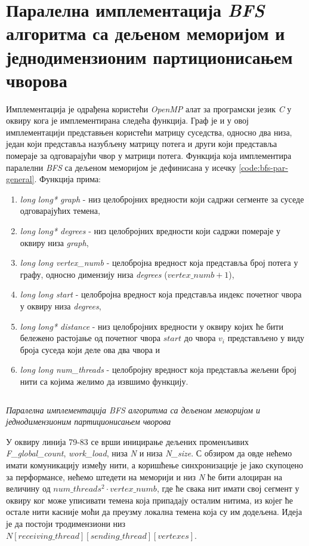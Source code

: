 \section{Паралелна имплементација \textit{BFS} алгоритма са дељеном меморијом и једнодимензионим партиционисањем чворова}
Имплементација је одрађена користећи \textit{OpenMP} алат за програмски језик \textit{C} у оквиру кога је имплементирана следећа функција. Граф је и у овој имплементацији представњен користећи матрицу суседства, односно два низа, један који представља назубљену матрицу потега и други који представља помераје за одговарајући чвор у матрици потега. Функција која имплементира паралелни \textit{BFS} са дељеном меморијом је дефинисана у исечку \ref{code:bfs-par-general}. Функција  прима:
\begin{enumerate}
    \item \textit{long long* graph} - низ целобројних вредности који садржи сегменте за суседе одговарајућих темена,
    \item \textit{long long* degrees} - низ целобројних вредности који садржи помераје у оквиру низа \textit{graph},
    \item \textit{long long vertex\_numb} - целобројна вредност која представља број потега у графу, односно димензију низа \textit{degrees} ($\textit{vertex\_numb} + 1$),
    \item \textit{long long start} - целобројна вредност која представља индекс почетног чвора у оквиру низа \textit{degrees},
    \item \textit{long long* distance} - низ целобројних вредности у оквиру којих ће бити бележено растојање од почетног чвора $start$ до чвора $v_i$ представљено у виду броја суседа који деле ова два чвора и
    \item \textit{long long num\_threads} - целобројну вредност која представља жељени број нити са којима желимо да извшимо функцију.
\end{enumerate}

\begin{listing}[H]
\inputminted[fontsize={\fontsize{6}{6}\selectfont},firstline=71,lastline=162]{c}{kodovi/bfs-par-general-1d.c}
\caption{\textit{Паралелна имплементација \textit{BFS} алгоритма са дељеном меморијом и једнодимензионим партиционисањем чворова}}
\label{code:bfs-par-general}
\end{listing}

\par
У оквиру линија 79-83 се врши иницирање дељених променљивих \textit{F\_global\_count}, \textit{work\_load}, низа \textit{N} и низа \textit{N\_size}. С обзиром да овде нећемо имати комуникацију између нити, а коришћење синхронизације је јако скупоцено за перформансе, нећемо штедети на меморији и низ \textit{N} ће бити алоциран на величину од $num\_threads^2 \cdot vertex\_numb$, где ће свака нит имати свој сегмент у оквиру ког може уписивати темена која припадају осталим нитима, из којег ће остале нити касније моћи да преузму локална темена која су им додељена. Идеја је да постоји тродимензиони низ $N[receiving\_thread][sending\_thread][vertexes]$.

